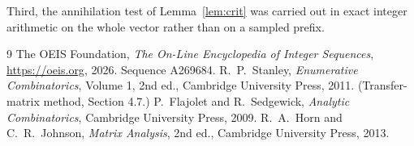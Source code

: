 \documentclass[11pt,a4paper]{article}
\theoremstyle{plain}
\theoremstyle{definition}
\begin{document}
Third, the annihilation test of Lemma~\ref{lem:crit} was carried out in exact integer
arithmetic on the whole vector rather than on a sampled prefix.

\begin{thebibliography}{9}
 The OEIS Foundation, \emph{The On-Line Encyclopedia of Integer
Sequences}, \url{https://oeis.org}, 2026. Sequence A269684.
 R.~P.~Stanley, \emph{Enumerative Combinatorics}, Volume 1, 2nd ed.,
Cambridge University Press, 2011. (Transfer-matrix method, Section 4.7.)
 P.~Flajolet and R.~Sedgewick, \emph{Analytic Combinatorics}, Cambridge
University Press, 2009.
 R.~A.~Horn and C.~R.~Johnson, \emph{Matrix Analysis}, 2nd ed., Cambridge
University Press, 2013.
\end{thebibliography}
\end{document}
